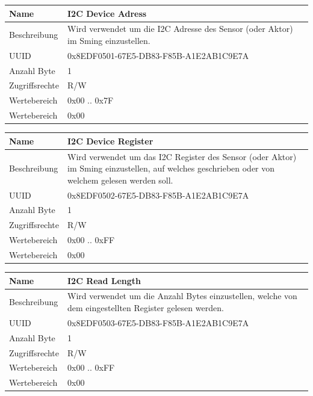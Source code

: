 \begin{tabularx}{\textwidth}{|l|X|}
\hline
Name & I2C Device Adress                                   \\
\hline
Beschreibung & Wird verwendet um die I2C Adresse des Sensor (oder Aktor) im Sming einzustellen. \\
\hline
UUID	&    0x8EDF0501-67E5-DB83-F85B-A1E2AB1C9E7A  \\
\hline     
Anzahl Byte	&    1  \\
\hline      
Zugriffsrechte	&   R/W  \\
\hline        
Wertebereich	&   0x00 .. 0x7F \\
\hline          
Wertebereich	&   0x00 \\
\hline                                     
\end{tabularx}

\begin{tabularx}{\textwidth}{|l|X|}
\hline
Name & I2C Device Register                                  \\
\hline
Beschreibung & Wird verwendet um das I2C Register des Sensor (oder Aktor) im Sming einzustellen, auf welches geschrieben oder von welchem gelesen werden soll. \\
\hline
UUID	&    0x8EDF0502-67E5-DB83-F85B-A1E2AB1C9E7A  \\
\hline     
Anzahl Byte	&    1  \\
\hline      
Zugriffsrechte	&   R/W  \\
\hline        
Wertebereich	&   0x00 .. 0xFF \\
\hline          
Wertebereich	&   0x00 \\
\hline                                     
\end{tabularx}

\begin{tabularx}{\textwidth}{|l|X|}
\hline
Name & I2C Read Length                              \\
\hline
Beschreibung & Wird verwendet um die Anzahl Bytes einzustellen, welche von dem eingestellten Register gelesen werden. \\
\hline
UUID	&    0x8EDF0503-67E5-DB83-F85B-A1E2AB1C9E7A \\
\hline     
Anzahl Byte	&    1  \\
\hline      
Zugriffsrechte	&   R/W  \\
\hline        
Wertebereich	&   0x00 .. 0xFF \\
\hline          
Wertebereich	&   0x00 \\
\hline                                     
\end{tabularx}

